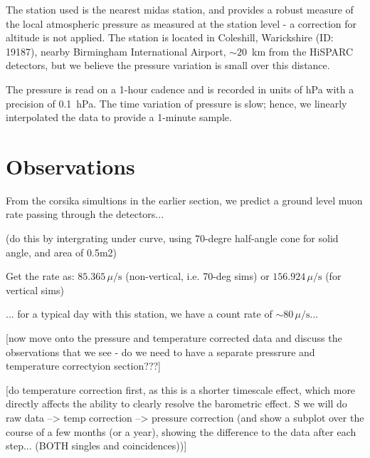 The station used is the nearest \gls{midas} station, and provides a robust measure of the local atmospheric pressure as measured at the station level - a correction for altitude is not applied. The station is located in Coleshill, Warickshire (ID: 19187), nearby Birmingham International Airport, $\sim 20$~km from the HiSPARC detectors, but we believe the pressure variation is small over this distance.

The pressure is read on a 1-hour cadence and is recorded in units of hPa with a precision of 0.1~hPa. The time variation of pressure is slow; hence, we linearly interpolated the data to provide a 1-minute sample.




\section{Observations}\label{sec:HS_14008_observations}

From the \gls{corsika} simultions in the earlier section, we predict a ground level muon rate passing through the detectors...

(do this by intergrating under curve, using 70-degre half-angle cone for solid angle, and area of 0.5m2)

Get the rate as: $85.365 \, \mu/\mathrm{s}$ (non-vertical, i.e. 70-deg sims) or $156.924 \, \mu/\mathrm{s}$ (for vertical sims)

... for a typical day with this station, we have a count rate of $\sim 80 \, \mu/\mathrm{s}$...


[now move onto the pressure and temperature corrected data and discuss the observations that we see - do we need to have a separate pressrure and temperature correctyion section???]

[do temperature correction first, as this is a shorter timescale effect, which more directly affects the ability to clearly resolve the barometric effect. S we will do raw data --> temp correction --> pressure correction (and show a subplot over the course of a few months (or a year), showing the difference to the data after each step... (BOTH singles and coincidences))]


